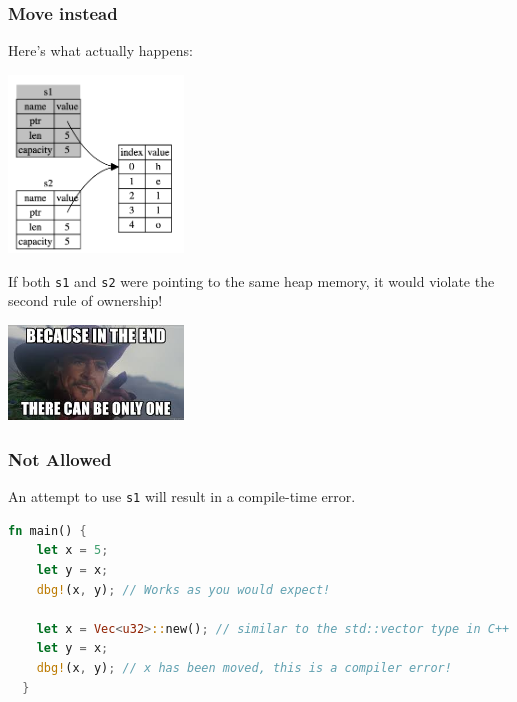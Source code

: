 \begin{frame}
\frametitle{Move instead}

Here's what actually happens:

\begin{center}
\includegraphics[width=0.35\textwidth]{images/string-rust.png}
\end{center}

If both \texttt{s1} and \texttt{s2} were pointing to the same heap memory, it would violate the second rule of ownership!

\begin{center}
	\includegraphics[width=0.35\textwidth]{images/highlander.jpeg}
\end{center}

\end{frame}


\begin{frame}[fragile]
\frametitle{Not Allowed}

An attempt to use \texttt{s1} will result in a compile-time error.

\begin{lstlisting}[language=Rust]
  fn main() {
    let x = 5;
    let y = x;
    dbg!(x, y); // Works as you would expect!

    let x = Vec<u32>::new(); // similar to the std::vector type in C++
    let y = x;
    dbg!(x, y); // x has been moved, this is a compiler error!
  }
\end{lstlisting}

\end{frame}


